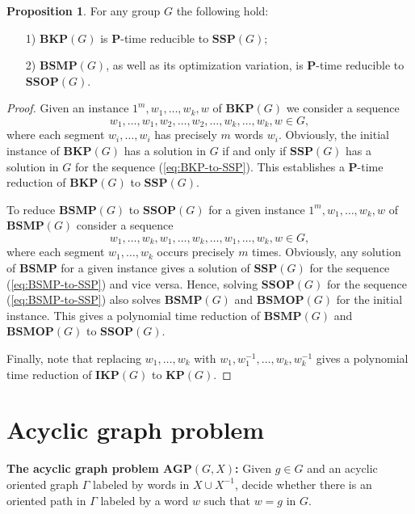 \documentclass[11pt]{amsart}
\theoremstyle{definition}
\newtheorem{proposition}[theorem]{Proposition}
\def\P{{\mathbf{P}}}
\def\SSP{{\mathbf{SSP}}}
\def\BSMP{{\mathbf{BSMP}}}
\def\BKP{{\mathbf{BKP}}}
\def\KP{{\mathbf{KP}}}
\def\IKP{{\mathbf{IKP}}}
\def\SSOP{{\mathbf{SSOP}}}
\def\BSMOP{{\mathbf{BSMOP}}}
\def\AGP{{\mathbf{AGP}}}
\begin{document}
\begin{proposition}
\label{pr:SSP-BKP}
For any group $G$ the following hold:
\begin{itemize}
\item [1)] $\BKP(G)$ is  $\P$-time reducible to $\SSP(G)$;
\item [2)] $\BSMP(G)$, as well as its optimization variation,  is $\P$-time reducible to $\SSOP(G)$.

\end{itemize}
\end{proposition}
\begin{proof}
Given an instance $1^m,w_1,\ldots,w_k,w$ of $\BKP(G)$ we consider a sequence
   \begin{equation} \label{eq:BKP-to-SSP}
   w_1,  \ldots,w_1, w_2, \ldots, w_2,  \ldots, w_k, \ldots,w_k, w \in G,
   \end{equation}
   where each segment $w_i, \ldots, w_i$ has precisely $m$ words $w_i$.
Obviously, the initial instance of $\BKP(G)$ has a solution in $G$ if and only if  $\SSP(G)$ has a solution in $G$ for the  sequence (\ref{eq:BKP-to-SSP}). This establishes a $\P$-time reduction of $\BKP(G)$ to $\SSP(G)$.

To reduce $\BSMP(G)$ to $\SSOP(G)$ for a given instance  $1^m,w_1,\ldots,w_k,w$ of $\BSMP(G)$ consider a sequence
\begin{equation} \label{eq:BSMP-to-SSP}
   w_1,  \ldots, w_k, w_1, \ldots, w_k,  \ldots, w_1, \ldots, w_k, w \in G,
   \end{equation}
where each segment $w_1,  \ldots, w_k$ occurs precisely $m$ times. Obviously, any solution of $\BSMP$ for a given instance gives a solution of $\SSP(G)$ for the sequence (\ref{eq:BSMP-to-SSP}) and vice versa. Hence, solving $\SSOP(G)$ for the sequence (\ref{eq:BSMP-to-SSP}) also solves $\BSMP(G)$  and  $\BSMOP(G)$ for the initial instance. This gives a  polynomial time reduction of $\BSMP(G)$ and $\BSMOP(G)$  to $\SSOP(G)$.

Finally, note that replacing $w_1,\ldots, w_k$ with
$w_1,w_1^{-1},\ldots, w_k,w_k^{-1}$ gives a polynomial time reduction of $\IKP(G)$ to $\KP(G)$.

\end{proof}

\section{Acyclic graph problem}\label{sec:agp}
\medskip
\noindent
{\bf The acyclic graph problem $\AGP(G,X)$\index{$\AGP(G,X)$}:} Given $g\in G$ and an acyclic oriented graph $\Gamma$ labeled by words in $X\cup X^{-1}$, decide whether there is an oriented path in $\Gamma$ labeled by a word $w$ such that $w=g$ in $G$.
\end{document}
